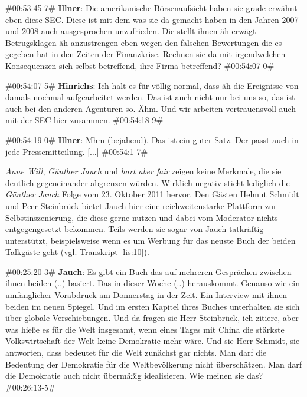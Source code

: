 \begin{description}
	\begin{linenumbers}[1]
		\item \#00:53:45-7\# \textbf{Illner}: Die amerikanische Börsenaufsicht haben sie grade erwähnt eben diese SEC. Diese ist mit dem was sie da gemacht haben in den Jahren 2007 und 2008 auch ausgesprochen unzufrieden. Die stellt ihnen äh erwägt Betrugsklagen äh anzustrengen eben wegen den falschen Bewertungen die es gegeben hat in den Zeiten der Finanzkrise. Rechnen sie da mit irgendwelchen Konsequenzen sich selbst betreffend, ihre Firma betreffend? \#00:54:07-0\#
		
		\item \#00:54:07-5\# \textbf{Hinrichs}: Ich halt es für völlig normal, dass äh die Ereignisse von damals nochmal aufgearbeitet werden. Das ist auch nicht nur bei uns so, das ist auch bei den anderen Agenturen so. Ähm. Und wir arbeiten vertrauensvoll auch mit der SEC hier zusammen. \#00:54:18-9\#
		
		\item \#00:54:19-0\# \textbf{Illner}: Mhm (bejahend). Das ist ein guter Satz. Der passt auch in jede Pressemitteilung. [$\ldots$] \#00:54:1-7\#
	\end{linenumbers}
\end{description}

\textit{Anne Will}, \textit{Günther Jauch} und \textit{hart aber fair} zeigen keine Merkmale, die sie deutlich gegeneinander abgrenzen würden. Wirklich negativ sticht lediglich die \textit{Günther Jauch} Folge vom 23. Oktober 2011 hervor. Den Gästen Helmut Schmidt und Peer Steinbrück bietet Jauch hier eine reichweitenstarke Plattform zur Selbstinszenierung, die diese gerne nutzen und dabei vom Moderator nichts entgegengesetzt bekommen. Teils werden sie sogar von Jauch tatkräftig unterstützt, beispielsweise wenn es um Werbung für das neuste Buch der beiden Talkgäste geht (vgl. Transkript \vref{lis:10}).

\begin{description}
	\begin{linenumbers}[1]
		\item \#00:25:20-3\# \textbf{Jauch}: Es gibt ein Buch das auf mehreren Gesprächen zwischen ihnen beiden (..) basiert. Das in dieser Woche (..) herauskommt. Genauso wie ein umfänglicher Vorabdruck am Donnerstag in der Zeit. Ein Interview mit ihnen beiden im neuen Spiegel. Und im ersten Kapitel ihres Buches unterhalten sie sich über globale Verschiebungen. Und da fragen sie Herr Steinbrück, ich zitiere, aber was hieße es für die Welt insgesamt, wenn eines Tages mit China die stärkste Volkswirtschaft der Welt keine Demokratie mehr wäre. Und sie Herr Schmidt, sie antworten, dass bedeutet für die Welt zunächst gar nichts. Man darf die Bedeutung der Demokratie für die Weltbevölkerung nicht überschätzen. Man darf die Demokratie auch nicht übermäßig idealisieren. Wie meinen sie das? \#00:26:13-5\#
	\end{linenumbers}
	\label{lis:12}
\end{description}

